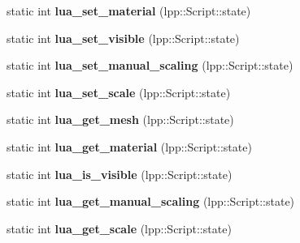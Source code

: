 \begin{DoxyCompactItemize}
\item 
static int {\bfseries lua\+\_\+set\+\_\+material} (lpp\+::\+Script\+::state)\hypertarget{class_lua_interface_a1d34ae0354dc0003a043524188f1b7fd}{}\label{class_lua_interface_a1d34ae0354dc0003a043524188f1b7fd}

\item 
static int {\bfseries lua\+\_\+set\+\_\+visible} (lpp\+::\+Script\+::state)\hypertarget{class_lua_interface_a62f2408b5220f1430583ea24c66795dc}{}\label{class_lua_interface_a62f2408b5220f1430583ea24c66795dc}

\item 
static int {\bfseries lua\+\_\+set\+\_\+manual\+\_\+scaling} (lpp\+::\+Script\+::state)\hypertarget{class_lua_interface_aaabaca1e0e0e47bdfd46fcd9e36856ba}{}\label{class_lua_interface_aaabaca1e0e0e47bdfd46fcd9e36856ba}

\item 
static int {\bfseries lua\+\_\+set\+\_\+scale} (lpp\+::\+Script\+::state)\hypertarget{class_lua_interface_a4360b8ff9e75c3a7e92ae9f9a1a2e1b5}{}\label{class_lua_interface_a4360b8ff9e75c3a7e92ae9f9a1a2e1b5}

\item 
static int {\bfseries lua\+\_\+get\+\_\+mesh} (lpp\+::\+Script\+::state)\hypertarget{class_lua_interface_a632c2b39769e0244e9bd126d25748a92}{}\label{class_lua_interface_a632c2b39769e0244e9bd126d25748a92}

\item 
static int {\bfseries lua\+\_\+get\+\_\+material} (lpp\+::\+Script\+::state)\hypertarget{class_lua_interface_a5d660da25de2858d3abb0639a5d25d75}{}\label{class_lua_interface_a5d660da25de2858d3abb0639a5d25d75}

\item 
static int {\bfseries lua\+\_\+is\+\_\+visible} (lpp\+::\+Script\+::state)\hypertarget{class_lua_interface_ae212219772ccdfaf006f2cba25dbd1e7}{}\label{class_lua_interface_ae212219772ccdfaf006f2cba25dbd1e7}

\item 
static int {\bfseries lua\+\_\+get\+\_\+manual\+\_\+scaling} (lpp\+::\+Script\+::state)\hypertarget{class_lua_interface_aaed92af55d5246374cc1e7665ede65a6}{}\label{class_lua_interface_aaed92af55d5246374cc1e7665ede65a6}

\item 
static int {\bfseries lua\+\_\+get\+\_\+scale} (lpp\+::\+Script\+::state)\hypertarget{class_lua_interface_a09d071df6cc205bcdfc04f1807ff91c1}{}\label{class_lua_interface_a09d071df6cc205bcdfc04f1807ff91c1}


\end{DoxyCompactItemize}
